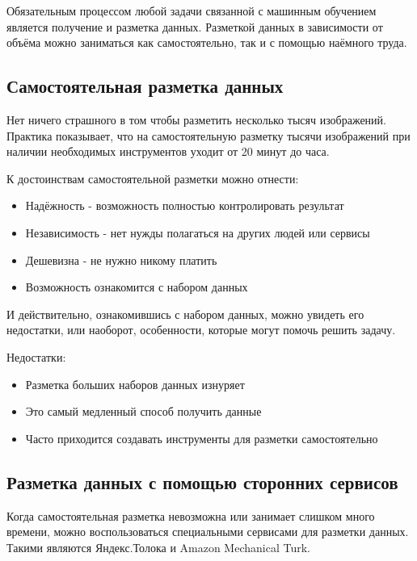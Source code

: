 Обязательным процессом любой задачи связанной с машинным обучением является получение и разметка данных. Разметкой данных в зависимости от объёма можно заниматься как самостоятельно, так и с помощью наёмного труда. 

\subsection{Самостоятельная разметка данных} \label{subsect1_3_1}
Нет ничего страшного в том чтобы разметить несколько тысяч изображений. Практика показывает, что на самостоятельную разметку тысячи изображений при наличии необходимых инструментов уходит от 20 минут до часа.

К достоинствам самостоятельной разметки можно отнести:
\begin{itemize}
    \item Надёжность - возможность полностью контролировать результат
    \item Независимость - нет нужды полагаться на других людей или сервисы
    \item Дешевизна - не нужно никому платить
    \item Возможность ознакомится с набором данных
\end{itemize}
И действительно, ознакомившись с набором данных, можно увидеть его недостатки, или наоборот, особенности, которые могут помочь решить задачу.

Недостатки:
\begin{itemize}
    \item Разметка больших наборов данных изнуряет
    \item Это самый медленный способ получить данные
    \item Часто приходится создавать инструменты для разметки самостоятельно
\end{itemize}


\subsection{Разметка данных с помощью сторонних сервисов} \label{subsect1_4_2}
Когда самостоятельная разметка невозможна или занимает слишком много времени, можно воспользоваться специальными сервисами для разметки данных. Такими являются Яндекс.Толока и Amazon Mechanical Turk.

